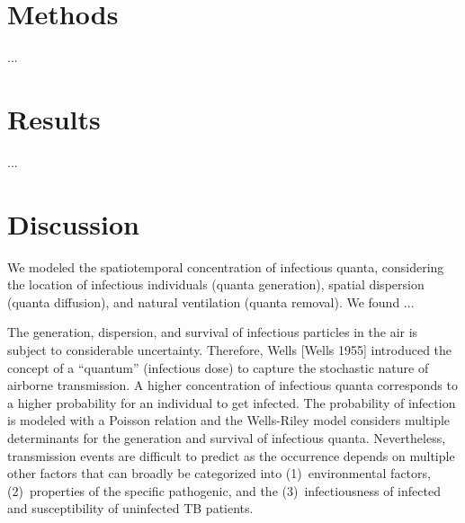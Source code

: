 \documentclass[fleqn,11pt]{wlscirep}
\begin{document}
\newpage

\section{Methods}

...


\newpage

\section{Results}

...


\FloatBarrier

\newpage

\section{Discussion}

We modeled the spatiotemporal concentration of infectious quanta, considering the location of infectious individuals (quanta generation), spatial dispersion (quanta diffusion), and natural ventilation (quanta removal). We found ... 




The generation, dispersion, and survival of infectious particles in the air is subject to considerable uncertainty. Therefore, Wells [Wells 1955] introduced the concept of a ``quantum'' (infectious dose) to capture the stochastic nature of airborne transmission. A higher concentration of infectious quanta corresponds to a higher probability for an individual to get infected. The probability of infection is modeled with a Poisson relation and the Wells-Riley model considers multiple determinants for the generation and survival of infectious quanta. Nevertheless, transmission events are difficult to predict as the occurrence depends on multiple other factors that can broadly be categorized into (1)~environmental factors, (2)~properties of the specific pathogenic, and the (3)~infectiousness of infected and susceptibility of uninfected TB patients. 
\end{document}

